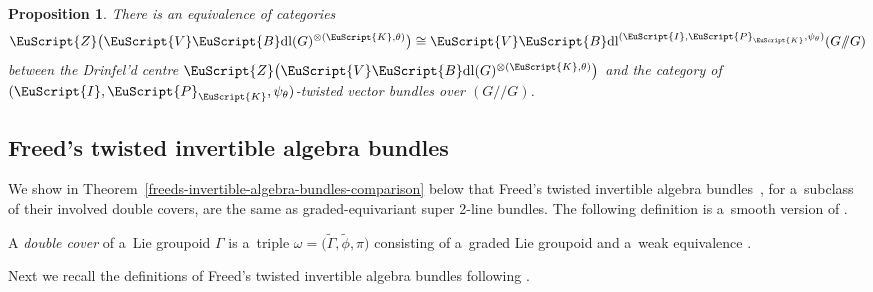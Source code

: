 \documentclass[pdftex]{sigma}
\numberwithin{equation}{section}
\newtheorem{Proposition}[Theorem]{Proposition}
 { \theoremstyle{definition}
\newtheorem{Definition}[Theorem]{Definition}
\newtheorem{Example}[Theorem]{Example}
\newtheorem{Remark}[Theorem]{Remark} }
\def\mathscr#1{\EuScript{#1}}
\def\act#1#2{#1/\!\!/#2}
\newcommand{\VectBdl}{\mathscr{V}\mathscr{B}\mathrm{dl}}
\begin{document}
\begin{Proposition}
There is an equivalence of categories
 \begin{equation*}
 \mathscr{Z}\bigl(\VectBdl(G)^{\otimes (\mathscr{K},\theta)}\bigr) \cong \VectBdl^{(\mathscr{I},\mathscr{P}_{\mathscr{K}},\psi_{\theta})}(\act GG)
 \end{equation*}
 between the Drinfel'd centre $\mathscr{Z}\bigl(\VectBdl(G)^{\otimes (\mathscr{K},\theta)}\bigr)$ and the category of $(\mathscr{I},\mathscr{P}_{\mathscr{K}},\psi_{\theta})$-twisted
 vector bundles over $(\act GG)$.
\end{Proposition}

\subsection{Freed's twisted invertible algebra bundles}
\label{Freed's invertible algebra bundle twistings}

We show in Theorem~\ref{freeds-invertible-algebra-bundles-comparison} below that Freed's twisted invertible algebra bundles~\cite{Freed2012a}, for a~subclass of their involved double covers, are the same as graded-equivariant super 2-line bundles.
The following definition is a~smooth version of \cite[Definition~1.95]{Freed2012a}.

\begin{Definition} \label{Definition: double cover}
 A \emph{double cover} of a~Lie groupoid $\Gamma$ is a~triple $\omega=\bigl(\tilde\Gamma,\tilde\phi,\pi\bigr)$ consisting of a~graded Lie groupoid \smash{$\bigl(\tilde \Gamma,\tilde \phi\bigr)$} and a~weak equivalence \smash{$\pi\colon \tilde \Gamma \to \Gamma$}. \end{Definition}

Next we recall the definitions of Freed's twisted invertible algebra bundles following {\cite[Definitions~1.59 and~1.99]{Freed2012a}}.
\end{document}
